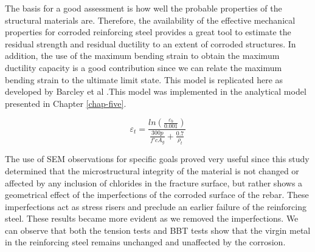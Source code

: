 The basis for a good assessment is how well the probable properties of the structural materials are. Therefore, the availability of the effective mechanical properties for corroded reinforcing steel provides a great tool to estimate the residual strength and residual ductility to an extent of corroded structures. In addition, the use of the maximum bending strain to obtain the maximum ductility capacity is a good contribution since we can relate the maximum bending strain to the ultimate limit state. This model is replicated here as  developed by Barcley et al \cite{Barcley2019}.This model was implemented in the analytical model presented in Chapter \ref{chap-five}. 

\begin{equation}
    \varepsilon_{t}=\frac{ln(\frac{\varepsilon_{b}}{0.001})}{\frac{300p}{f'c A_{g}}+\frac{0.7}{\rho_{t}}}
    \label{eq.BarFracture}
\end{equation}

The use of SEM observations for specific goals proved very useful since this study determined that the microstructural integrity of the material is not changed or affected by any inclusion of chlorides in the fracture surface, but rather shows a geometrical effect of the imperfections of the corroded surface of the rebar. These imperfections act as stress risers and preclude an earlier failure of the reinforcing steel. These results became more evident as we removed the imperfections. We can observe that both the tension tests and BBT tests show that the virgin metal in the reinforcing steel remains unchanged and unaffected by the corrosion.



